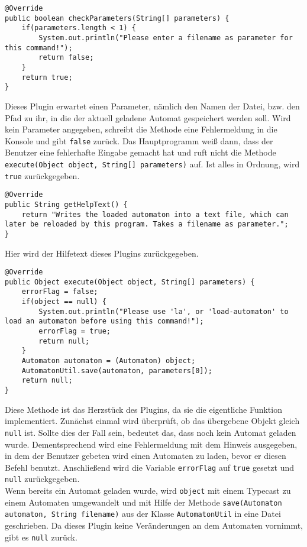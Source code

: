\begin{lstlisting}[frame=single, basicstyle=\small, caption=Die Methode \textit{checkParameters}]
@Override
public boolean checkParameters(String[] parameters) {
	if(parameters.length < 1) {
		System.out.println("Please enter a filename as parameter for this command!");
		return false;
	}
	return true;
}
\end{lstlisting}
Dieses Plugin erwartet einen Parameter, nämlich den Namen der Datei, bzw. den Pfad zu ihr, in die der aktuell geladene Automat gespeichert werden soll. Wird kein Parameter angegeben, schreibt die Methode eine Fehlermeldung in die Konsole und gibt \lstinline[columns=fixed]{false} zurück. Das Hauptprogramm weiß dann, dass der Benutzer eine fehlerhafte Eingabe gemacht hat und ruft nicht die Methode \lstinline[columns=fixed]{execute(Object object, String[] parameters)} auf. Ist alles in Ordnung, wird \lstinline[columns=fixed]{true} zurückgegeben.
\begin{lstlisting}[frame=single, basicstyle=\small, caption=Die Methode \textit{getHelpText}]
@Override
public String getHelpText() {
	return "Writes the loaded automaton into a text file, which can later be reloaded by this program. Takes a filename as parameter.";
}
\end{lstlisting}
Hier wird der Hilfetext dieses Plugins zurückgegeben.
\newpage
\begin{lstlisting}[frame=single, basicstyle=\small, caption=Die Methode \textit{execute}]
@Override
public Object execute(Object object, String[] parameters) {
	errorFlag = false;
	if(object == null) {
		System.out.println("Please use 'la', or 'load-automaton' to load an automaton before using this command!");
		errorFlag = true;
		return null;
	}
	Automaton automaton = (Automaton) object;
	AutomatonUtil.save(automaton, parameters[0]);
	return null;
}
\end{lstlisting}
Diese Methode ist das Herzstück des Plugins, da sie die eigentliche Funktion implementiert. Zunächst einmal wird überprüft, ob das übergebene Objekt gleich \lstinline[columns=fixed]{null} ist. Sollte dies der Fall sein, bedeutet das, dass noch kein Automat geladen wurde. Dementsprechend wird eine Fehlermeldung mit dem Hinweis ausgegeben, in dem der Benutzer gebeten wird einen Automaten zu laden, bevor er diesen Befehl benutzt. Anschließend wird die Variable \lstinline[columns=fixed]{errorFlag} auf \lstinline[columns=fixed]{true} gesetzt und \lstinline[columns=fixed]{null} zurückgegeben.\\
Wenn bereits ein Automat geladen wurde, wird \lstinline[columns=fixed]{object} mit einem Typecast zu einem Automaten umgewandelt und mit Hilfe der Methode \lstinline[columns=fixed]{save(Automaton automaton, String filename)} aus der Klasse \lstinline[columns=fixed]{AutomatonUtil} in eine Datei geschrieben. Da dieses Plugin keine Veränderungen an dem Automaten vornimmt, gibt es \lstinline[columns=fixed]{null} zurück.
